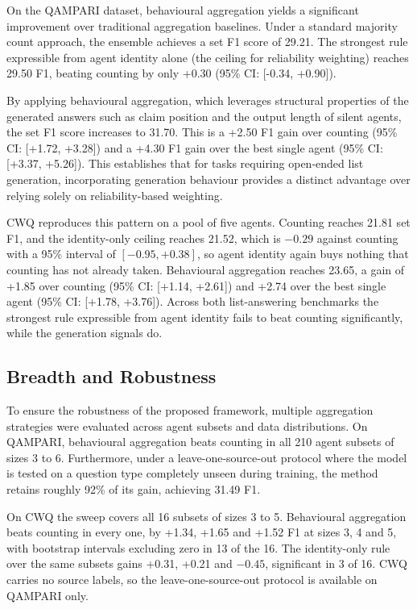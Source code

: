 \documentclass{article}
\begin{document}

On the QAMPARI dataset, behavioural aggregation yields a significant improvement over traditional aggregation baselines. Under a standard majority count approach, the ensemble achieves a set F1 score of 29.21. The strongest rule expressible from agent identity alone (the ceiling for reliability weighting) reaches 29.50 F1, beating counting by only +0.30 (95\% CI: [-0.34, +0.90]).

By applying behavioural aggregation, which leverages structural properties of the generated answers such as claim position and the output length of silent agents, the set F1 score increases to 31.70. This is a +2.50 F1 gain over counting (95\% CI: [+1.72, +3.28]) and a +4.30 F1 gain over the best single agent (95\% CI: [+3.37, +5.26]). This establishes that for tasks requiring open-ended list generation, incorporating generation behaviour provides a distinct advantage over relying solely on reliability-based weighting.

CWQ reproduces this pattern on a pool of five agents. Counting reaches 21.81 set F1, and the identity-only ceiling reaches 21.52, which is $-0.29$ against counting with a 95\% interval of $[-0.95, +0.38]$, so agent identity again buys nothing that counting has not already taken. Behavioural aggregation reaches 23.65, a gain of +1.85 over counting (95\% CI: [+1.14, +2.61]) and +2.74 over the best single agent (95\% CI: [+1.78, +3.76]). Across both list-answering benchmarks the strongest rule expressible from agent identity fails to beat counting significantly, while the generation signals do.


\subsection{Breadth and Robustness}
\label{sec:breadth}
\label{sec:robust}

To ensure the robustness of the proposed framework, multiple aggregation strategies were evaluated across agent subsets and data distributions. On QAMPARI, behavioural aggregation beats counting in all 210 agent subsets of sizes 3 to 6. Furthermore, under a leave-one-source-out protocol where the model is tested on a question type completely unseen during training, the method retains roughly 92\% of its gain, achieving 31.49 F1.

On CWQ the sweep covers all 16 subsets of sizes 3 to 5. Behavioural aggregation beats counting in every one, by +1.34, +1.65 and +1.52 F1 at sizes 3, 4 and 5, with bootstrap intervals excluding zero in 13 of the 16. The identity-only rule over the same subsets gains +0.31, +0.21 and $-0.45$, significant in 3 of 16. CWQ carries no source labels, so the leave-one-source-out protocol is available on QAMPARI only.
\end{document}
